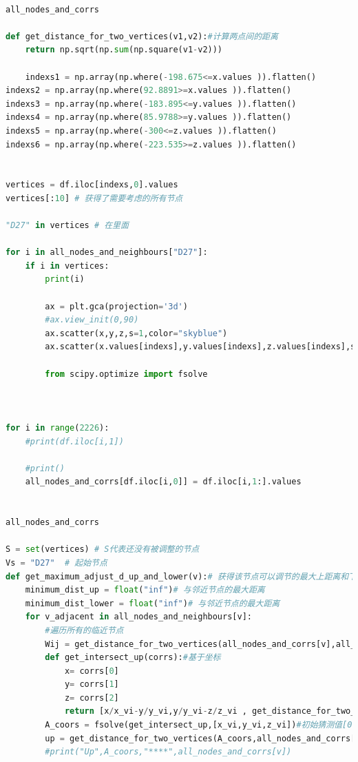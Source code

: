 \documentclass[withoutpreface,bwprint]{cumcmthesis} %
\begin{document}
\begin{appendices}
\begin{lstlisting}[language=python]
    
all_nodes_and_corrs    

def get_distance_for_two_vertices(v1,v2):#计算两点间的距离
    return np.sqrt(np.sum(np.square(v1-v2)))

    indexs1 = np.array(np.where(-198.675<=x.values )).flatten()
indexs2 = np.array(np.where(92.8891>=x.values )).flatten()
indexs3 = np.array(np.where(-183.895<=y.values )).flatten()
indexs4 = np.array(np.where(85.9788>=y.values )).flatten()
indexs5 = np.array(np.where(-300<=z.values )).flatten()
indexs6 = np.array(np.where(-223.535>=z.values )).flatten()


vertices = df.iloc[indexs,0].values
vertices[:10] # 获得了需要考虑的所有节点

"D27" in vertices # 在里面

for i in all_nodes_and_neighbours["D27"]:
    if i in vertices:
        print(i)

        ax = plt.gca(projection='3d')
        #ax.view_init(0,90)
        ax.scatter(x,y,z,s=1,color="skyblue")
        ax.scatter(x.values[indexs],y.values[indexs],z.values[indexs],s=2,color="red")

        from scipy.optimize import fsolve



for i in range(2226):
    #print(df.iloc[i,1])

    #print()
    all_nodes_and_corrs[df.iloc[i,0]] = df.iloc[i,1:].values

    
all_nodes_and_corrs    

S = set(vertices) # S代表还没有被调整的节点
Vs = "D27"  # 起始节点
def get_maximum_adjust_d_up_and_lower(v):# 获得该节点可以调节的最大上距离和下距离
    minimum_dist_up = float("inf")# 与邻近节点的最大距离
    minimum_dist_lower = float("inf")# 与邻近节点的最大距离
    for v_adjacent in all_nodes_and_neighbours[v]:
        #遍历所有的临近节点
        Wij = get_distance_for_two_vertices(all_nodes_and_corrs[v],all_nodes_and_corrs[v_adjacent])
        def get_intersect_up(corrs):#基于坐标
            x= corrs[0]
            y= corrs[1]
            z= corrs[2]
            return [x/x_vi-y/y_vi,y/y_vi-z/z_vi , get_distance_for_two_vertices([x,y,z],all_nodes_and_corrs[v_adjacent])-Wij*(1-0.0007)]
        A_coors = fsolve(get_intersect_up,[x_vi,y_vi,z_vi])#初始猜测值[0,-1]
        up = get_distance_for_two_vertices(A_coors,all_nodes_and_corrs[v])
        #print("Up",A_coors,"****",all_nodes_and_corrs[v])
        

\end{lstlisting}
\end{appendices}
\end{document}
